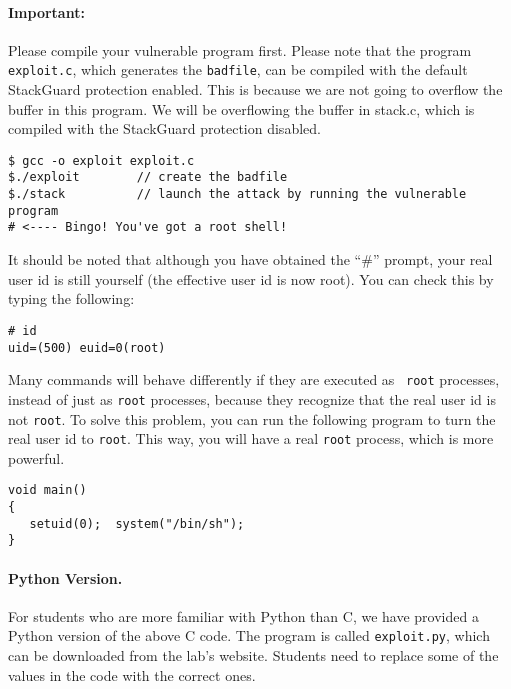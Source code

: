 \paragraph{Important:} Please compile your vulnerable program
first. Please note that the program \texttt{exploit.c}, which generates the \texttt{badfile}, 
can be compiled with the default StackGuard protection
enabled. This is because we are not going to overflow the buffer in
this program. We will be overflowing the buffer in stack.c, which is
compiled with the StackGuard protection disabled.


\begin{lstlisting}
$ gcc -o exploit exploit.c
$./exploit        // create the badfile
$./stack          // launch the attack by running the vulnerable program
# <---- Bingo! You've got a root shell! 
\end{lstlisting}

It should be noted that although you have obtained the ``\#'' prompt, 
your real user id is still yourself (the effective user id is now
root). You can check this by typing the following:


\begin{lstlisting}
# id
uid=(500) euid=0(root)
\end{lstlisting}


Many commands will behave differently if they are executed as 
\setuid\ {\tt root} processes, instead of just as {\tt root} processes, 
because they 
recognize that the real user id is not {\tt root}.  To solve this problem,
you can run the following program to turn the real user id to
{\tt root}. This way, you will have a real {\tt root} process, which
is more powerful.
  
\begin{lstlisting}
void main()
{ 
   setuid(0);  system("/bin/sh");
}
\end{lstlisting}


\paragraph{Python Version.} For students who are more familiar with Python than C, we have 
provided a Python version of the above C code. The program is called \texttt{exploit.py}, which
can be downloaded from the lab's website. Students need to replace some of the values
in the code with the correct ones. 


